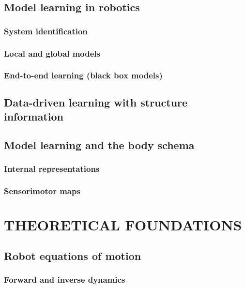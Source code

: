 \documentclass{article}
\begin{document}
\subsection{Model learning in robotics}
\subsubsection{System identification}
\subsubsection{Local and global models}
\subsubsection{End-to-end learning (black box models)}
\subsection{Data-driven learning with structure information}
\subsection{Model learning and the body schema}
\subsubsection{Internal representations}
\subsubsection{Sensorimotor maps}

\section{THEORETICAL FOUNDATIONS}
\subsection{Robot equations of motion}
\subsubsection{Forward and inverse dynamics}
\end{document}
